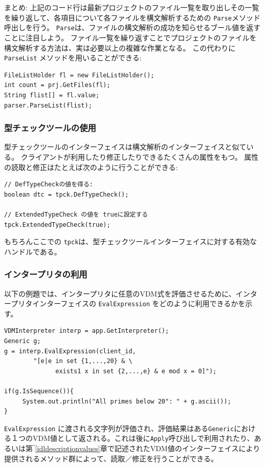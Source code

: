 \documentclass[\pformat,12pt]{jarticle}
\begin{document}
まとめ: 上記のコード行は最新プロジェクトのファイル一覧を取り出しその一覧を繰り返して、各項目について各ファイルを構文解析するための {\tt Parse}メソッド呼出しを行う。
 {\tt Parse}は、ファイルの構文解析の成功を知らせるブール値を返すことに注目しよう。
ファイル一覧を繰り返すことでプロジェクトのファイルを構文解析する方法は、実は必要以上の複雑な作業となる。
この代わりに{\tt ParseList} メソッドを用いることができる:

\begin{verbatim}
FileListHolder fl = new FileListHolder();
int count = prj.GetFiles(fl);
String flist[] = fl.value;
parser.ParseList(flist);
\end{verbatim}

\subsubsection{型チェックツールの使用}

型チェックツールのインターフェイスは構文解析のインターフェイスと似ている。
クライアントが利用したり修正したりできるたくさんの属性をもつ。
属性の読取と修正はたとえば次のように行うことができる:

\begin{verbatim}
// DefTypeCheckの値を得る:
boolean dtc = tpck.DefTypeCheck();

// ExtendedTypeCheck の値を trueに設定する
tpck.ExtendedTypeCheck(true);
\end{verbatim}

もちろんここでの \texttt{tpck}は、型チェックツールインターフェイスに対する有効なハンドルである。


\subsubsection{インタープリタの利用}\label{java:interp}

以下の例題では、インタープリタに任意のVDM式を評価させるために、インタープリタインターフェイスの {\tt EvalExpression} をどのように利用できるかを示す。

\begin{verbatim}
VDMInterpreter interp = app.GetInterpreter();
Generic g;
g = interp.EvalExpression(client_id, 
        "[e|e in set {1,...,20} & \
              exists1 x in set {2,...,e} & e mod x = 0]");

if(g.IsSequence()){
     System.out.println("All primes below 20": " + g.ascii());
}
\end{verbatim}

{\tt EvalExpression} に渡される文字列が評価され、評価結果はある{\tt Generic}における１つのVDM値として返される。これは後に{\tt Apply}呼び出しで利用されたり、あるいは第‾\ref{idldescriptionvalues}章で記述されたVDM値のインターフェイスにより提供されるメソッド群によって、読取／修正を行うことができる。
\end{document}
